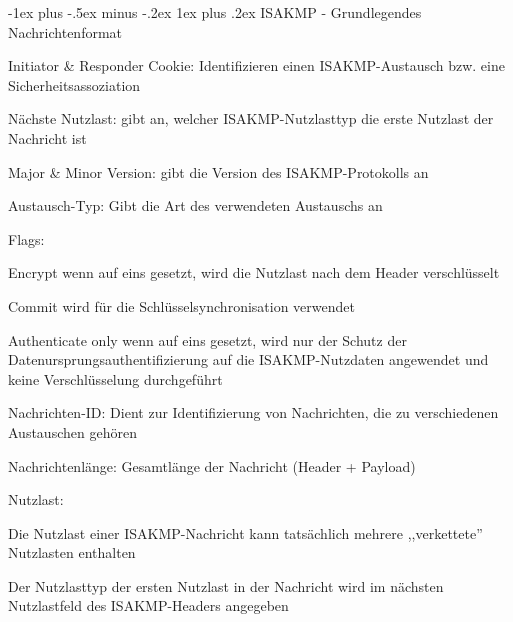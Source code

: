 \documentclass[a4paper]{article}
\makeatletter
\renewcommand{\subsubsection}{\@startsection{subsubsection}{3}{0mm}%
 {-1ex plus -.5ex minus -.2ex}%
 {1ex plus .2ex}%
 {\normalfont\small\bfseries}}
\makeatother
\begin{document}
\begin{multicols}{3}
      \subsubsection{ISAKMP - Grundlegendes Nachrichtenformat}
      \begin{itemize*}
            \item Initiator \& Responder Cookie: Identifizieren einen ISAKMP-Austausch bzw. eine Sicherheitsassoziation
            \item Nächste Nutzlast: gibt an, welcher ISAKMP-Nutzlasttyp die erste Nutzlast der Nachricht ist
            \item Major \& Minor Version: gibt die Version des ISAKMP-Protokolls an
            \item Austausch-Typ: Gibt die Art des verwendeten Austauschs an
            \item Flags:
            \begin{description*}
                  \item[Encrypt] wenn auf eins gesetzt, wird die Nutzlast nach dem Header verschlüsselt
                  \item[Commit] wird für die Schlüsselsynchronisation verwendet
                  \item[Authenticate only] wenn auf eins gesetzt, wird nur der Schutz der Datenursprungsauthentifizierung auf die ISAKMP-Nutzdaten angewendet und keine Verschlüsselung durchgeführt
            \end{description*}
            \item Nachrichten-ID: Dient zur Identifizierung von Nachrichten, die zu verschiedenen Austauschen gehören
            \item Nachrichtenlänge: Gesamtlänge der Nachricht (Header + Payload)
            \item Nutzlast:
            \begin{itemize*}
                  \item Die Nutzlast einer ISAKMP-Nachricht kann tatsächlich mehrere ,,verkettete'' Nutzlasten enthalten
                  \item Der Nutzlasttyp der ersten Nutzlast in der Nachricht wird im nächsten Nutzlastfeld des ISAKMP-Headers angegeben

\end{itemize*}
\end{itemize*}
\end{multicols}
\end{document}
